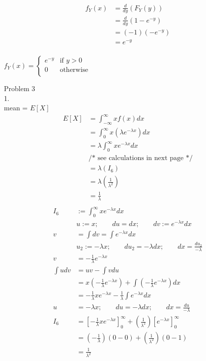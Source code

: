 \documentclass[12pt,border=4pt,multi]{article}%
\begin{document}
\begin{align*}
f_Y(x) &= \frac{d}{dy}\left(F_Y(y)\right)\\
&= \frac{d}{dy}\left(1 - e^{-y}\right)\\
&= (-1)(-e^{-y})\\
&= e^{-y}\\
\end{align*}
\begin{center}
$\boxed{
f_Y(x) =
\begin{cases}
e^{-y} & \text{if } y > 0\\
0 & \text{otherwise}\\
\end{cases}
}$
\end{center}
\newpage
\noindent
Problem 3\\
1.\\
mean = $E[X]$
\begin{align*}
E[X] &= \int_{-\infty}^{\infty} xf(x) dx\\
&= \int_0^{\infty} x\left(\lambda e^{-\lambda x}\right) dx\\
&= \lambda\int_0^{\infty} xe^{-\lambda x} dx\\
&\text{/* see calculations in next page */}\\
&= \lambda(I_6)\\
&= \lambda\left(\frac{1}{\lambda^2}\right)\\
&= \boxed{\frac{1}{\lambda}}\\
\end{align*}
\begin{align*}
I_6 &:= \int_0^{\infty} xe^{-\lambda x} dx\\
&u := x;\qquad du = dx;\qquad dv := e^{-\lambda x}dx\\
v &= \int dv = \int e^{-\lambda x}dx\\
&u_2 := -\lambda x; \qquad du_2 = -\lambda dx; \qquad dx = \frac{du_2}{-\lambda}\\
v &= -\frac{1}{\lambda} e^{-\lambda x}\\
\int udv &= uv - \int vdu\\
&= x\left( -\frac{1}{\lambda} e^{-\lambda x}\right) + \int\left( -\frac{1}{\lambda} e^{-\lambda x}\right)dx\\
&= -\frac{1}{\lambda} xe^{-\lambda x} - \frac{1}{\lambda}\int e^{-\lambda x}dx\\
u &= -\lambda x; \qquad du = -\lambda dx; \qquad dx = \frac{du}{-\lambda}\\ 
I_6 &= \left[-\frac{1}{\lambda} xe^{-\lambda x}\right]_0^{\infty} + \left(\frac{1}{\lambda^2}\right)\left[e^{-\lambda x}\right]_0^{\infty}\\
&= \left(-\frac{1}{\lambda}\right)\left(0 - 0\right) + \left(\frac{1}{\lambda^2}\right)\left(0 - 1\right)\\
&= \frac{1}{\lambda^2}\\
\end{align*}
\end{document}

